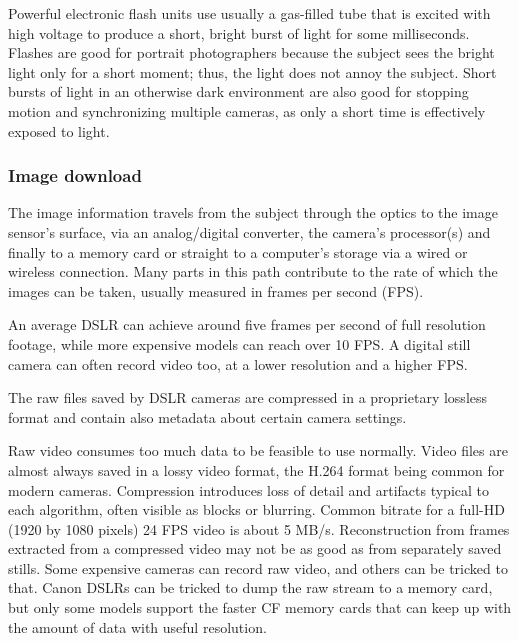 Powerful electronic flash units use usually a gas-filled tube that is excited with high voltage to produce a short, bright burst of light for some milliseconds.
Flashes are good for portrait photographers because the subject sees the bright light only for a short moment; thus, the light does not annoy the subject.
Short bursts of light in an otherwise dark environment are also good for stopping motion and synchronizing multiple cameras, as only a short time is effectively exposed to light.






\subsubsection{Image download} %


The image information travels from the subject through the optics to the image sensor's surface, via an analog/digital converter, the camera's processor(s) and finally to a memory card or straight to a computer's storage via a wired or wireless connection.
Many parts in this path contribute to the rate of which the images can be taken, usually measured in frames per second (FPS).


An average DSLR can achieve around five frames per second of full resolution footage, while more expensive models can reach over 10 FPS.
A digital still camera can often record video too, at a lower resolution and a higher FPS.



The raw files saved by DSLR cameras are compressed in a proprietary lossless format and contain also metadata about certain camera settings.

Raw video consumes too much data to be feasible to use normally.
Video files are almost always saved in a lossy video format, the H.264 format being common for modern cameras.
Compression introduces loss of detail and artifacts typical to each algorithm, often visible as blocks or blurring.
Common bitrate for a full-HD (1920 by 1080 pixels) 24 FPS video is about 5 MB/s.
Reconstruction from frames extracted from a compressed video may not be as good as from separately saved stills.
Some expensive cameras can record raw video, and others can be tricked to that.
Canon DSLRs can be tricked to dump the raw stream to a memory card, but only some models support the faster CF memory cards that can keep up with the amount of data with useful resolution.

